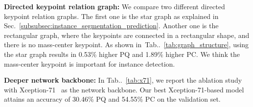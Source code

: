 \documentclass[10pt,twocolumn,letterpaper]{article}
\makeatletter
\def\@onedot{\ifx\@let@token.\else.\null\fi\xspace}
\DeclareRobustCommand\onedot{\futurelet\@let@token\@onedot}
\newcommand{\tabref}[1]{Tab\onedot~\ref{#1}}
\makeatother
\begin{document}
{\bf Directed keypoint relation graph:} We compare two different directed keypoint relation graphs. The first one is the star graph as explained in Sec.~\ref{subsubsec:instance_segmentation_prediction}. Another one is the rectangular graph, where the keypoints are connected in a rectangular shape, and there is no mass-center keypoint. As shown in~\tabref{tab:graph_structure}, using the star graph results in 0.53\% higher PQ and 1.89\% higher PC. We think the mass-center keypoint is important for instance detection.

\begin{table}[!t]
  \centering
  \caption{The comparison between alternative directed keypoint relation graphs. Employing the star graph where the mass-center keypoint is connected to the other four keypoints leads to higher accuracy than the rectangle graph.}
  \label{tab:graph_structure}
\end{table}

{\bf Deeper network backbone:} In \tabref{tab:x71}, we report the ablation study with Xception-71~\cite{chollet2016xception,dai2017coco,deeplabv3plus2018} as the network backbone. Our best Xception-71-based model attains an accuracy of 30.46\% PQ and 54.55\% PC on the validation set.

\begin{table}[!t]
  \centering
  \caption{Employing Xception-71 as the network backbone with different methods. {\bf ASPP:} Encoder with Atrous Spatial Pyramid Pooling. {\bf BU:} Decoder with Bilinear Upsampling. {\bf S2D:} Decoder with D2S and S2D. {\bf HPM:} Hard Pixel Mining. {\bf SI:} Larger loss weights on Small Instances.}
  \label{tab:x71}
\end{table}
\end{document}
